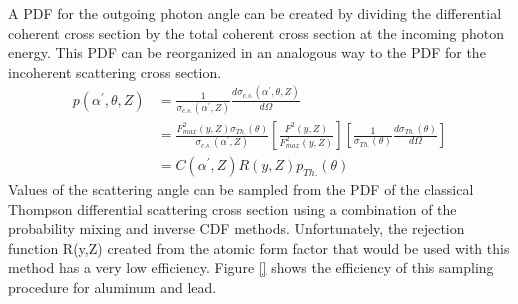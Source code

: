 A PDF for the outgoing photon angle can be created by dividing the differential
coherent cross section by the total coherent cross section at the incoming
photon energy. This PDF can be reorganized in an analogous way to the PDF for 
the incoherent scattering cross section. 
\begin{align}
  p(\alpha^{'},\theta,Z) & = \frac{1}{\sigma_{c.s.}(\alpha^{'},Z)}
  \frac{d\sigma_{c.s.}(\alpha^{'},\theta,Z)}{d\Omega} \nonumber \\
  & = \frac{F^2_{max}(y,Z) \sigma_{Th.}(\theta)}{\sigma_{c.s.}(\alpha^{'},Z)}
  \left[\frac{F^2(y,Z)}{F^2_{max}(y,Z)}\right]
  \left[\frac{1}{\sigma_{Th.}(\theta)} \frac{d\sigma_{Th.}(\theta)}{d\Omega}
  \right] \nonumber \\
  & = C(\alpha^{'},Z)R(y,Z)p_{Th.}(\theta) \nonumber
\end{align}
Values of the scattering angle can be sampled from the PDF of the classical 
Thompson differential scattering cross section using a combination of the 
probability mixing and inverse CDF methods. Unfortunately, the rejection
function R(y,Z) created from the atomic form factor that would be used with this
method has a very low efficiency. Figure \ref{} shows the efficiency of this 
sampling procedure for aluminum and lead. 

